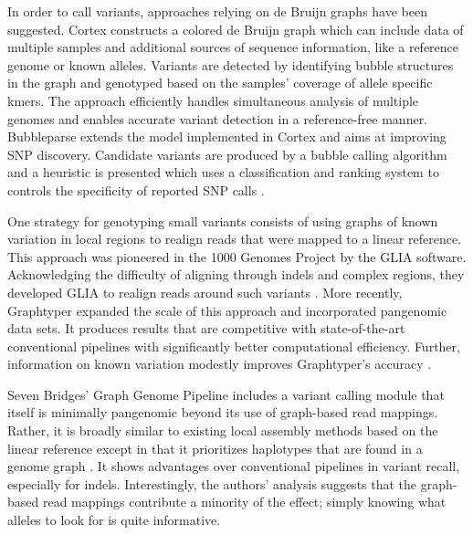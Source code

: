 In order to call variants, approaches relying on de Bruijn graphs have been suggested.
Cortex \cite{Iqbal_2012} constructs a colored de Bruijn graph which can include data of multiple samples and additional sources of sequence information, like a reference genome or known alleles. 
Variants are detected by identifying bubble structures in the graph and  genotyped based on the samples' coverage of allele specific kmers.
The approach efficiently handles simultaneous analysis of multiple genomes and enables accurate variant detection in a reference-free manner.
Bubbleparse \cite{Leggett_2013} extends the model implemented in Cortex and aims at improving SNP discovery.
Candidate variants are produced by a bubble calling algorithm and a heuristic is presented which uses a classification and ranking system to controls the specificity of reported SNP calls \cite{Leggett_2013}.

One strategy for genotyping small variants consists of using graphs of known variation in local regions to realign reads that were mapped to a linear reference.
This approach was pioneered in the 1000 Genomes Project by the GLIA software.
Acknowledging the difficulty of aligning through indels and complex regions, they developed GLIA to realign reads around such variants \cite{1000_2015}.
More recently, Graphtyper expanded the scale of this approach and incorporated pangenomic data sets.
It produces results that are competitive with state-of-the-art conventional pipelines with significantly better computational efficiency.
Further, information on known variation modestly improves Graphtyper's accuracy \cite{eggertsson2017graphtyper}.

Seven Bridges' Graph Genome Pipeline includes a variant calling module that itself is minimally pangenomic beyond its use of graph-based read mappings.
Rather, it is broadly similar to existing local assembly methods based on the linear reference \cite{Poplin_2017, Rimmer_2014} except in that it prioritizes haplotypes that are found in a genome graph \cite{Rakocevic_2019}.
It shows advantages over conventional pipelines in variant recall, especially for indels.
Interestingly, the authors' analysis suggests that the graph-based read mappings contribute a minority of the effect; simply knowing what alleles to look for is quite informative.


